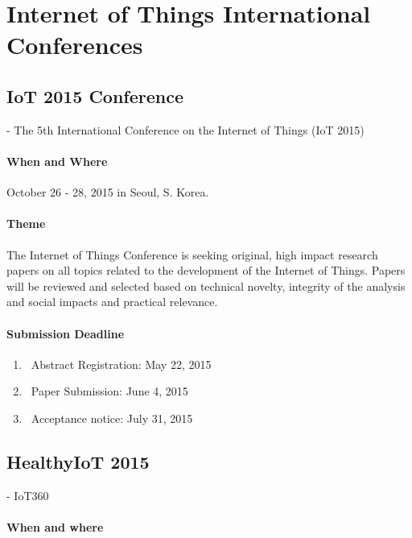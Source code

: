 \documentclass[12pt]{article}
\begin{document}
\maketitle



\section{Internet of Things International Conferences}


\subsection {IoT 2015 Conference} -
The 5th International Conference on the Internet of Things (IoT 2015) 


\paragraph{When and Where} October 26 - 28, 2015 in Seoul, S. Korea.

 \paragraph{Theme}The Internet of Things Conference is seeking original, high impact research papers on all topics related to the development of the Internet of Things. Papers will be reviewed and selected based on technical novelty, integrity of the analysis and social impacts and practical relevance.

\paragraph{Submission Deadline}
\begin{enumerate}
\item\ Abstract Registration: May 22, 2015
\item\ Paper Submission: June 4, 2015
\item\ Acceptance notice: July 31, 2015

\end{enumerate}

\subsection {HealthyIoT 2015} - IoT360
\paragraph {When and where}
\end{document}
